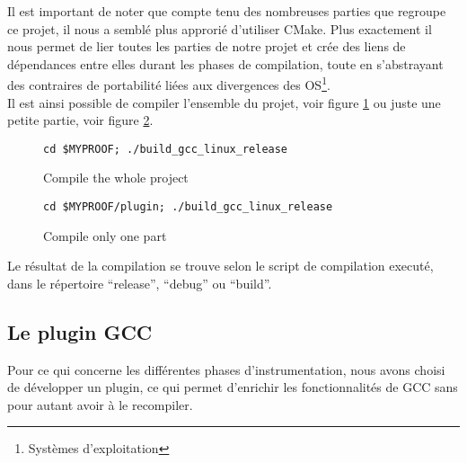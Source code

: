 Il est important de noter que compte tenu des nombreuses parties que regroupe ce projet, il nous a semblé plus approrié d'utiliser CMake. Plus exactement il nous permet de lier toutes les parties de notre projet et crée des liens de dépendances entre elles durant les phases de compilation, toute en s'abstrayant des contraires de portabilité liées aux divergences des OS\footnote{Systèmes d'exploitation}.\\

Il est ainsi possible de compiler l'ensemble du projet, voir figure \ref{fig:compile_whole_project} ou juste une petite partie, voir figure \ref{fig:compile_one_part}.

\begin{figure}[here]
  \centering
  \verb#cd $MYPROOF; ./build_gcc_linux_release#
  \caption{Compile the whole project}
  \label{fig:compile_whole_project}
\end{figure}

\begin{figure}[here]
  \centering
  \verb#cd $MYPROOF/plugin; ./build_gcc_linux_release#
  \caption{Compile only one part}
  \label{fig:compile_one_part}
\end{figure}

Le résultat de la compilation se trouve selon le script de compilation executé, dans le répertoire ``release'', ``debug'' ou ``build''.

\subsection{Le plugin GCC}

Pour ce qui concerne les différentes phases d'instrumentation, nous avons choisi de développer un plugin, ce qui permet d'enrichir les fonctionnalités de GCC sans pour autant avoir à le recompiler.


